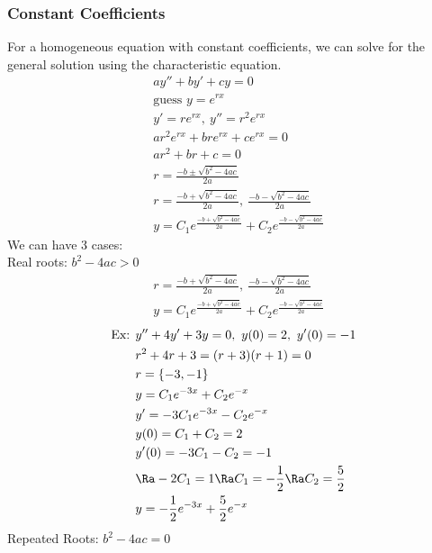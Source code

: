 \subsubsection{Constant Coefficients}
For a homogeneous equation with constant coefficients, we can solve for the general solution using the characteristic equation.
\begin{align*}
    &ay''+by'+cy=0\\
    &\text{guess }y=e^{rx}\\
    &y'=re^{rx},\ y''=r^2e^{rx}\\
    &ar^2e^{rx}+bre^{rx}+ce^{rx}=0\\
    &ar^2+br+c=0\\
    &r=\frac{-b\pm\sqrt{b^2-4ac}}{2a}\\
    &r=\frac{-b+\sqrt{b^2-4ac}}{2a},\ \frac{-b-\sqrt{b^2-4ac}}{2a}\\
    &y=C_1e^{\frac{-b+\sqrt{b^2-4ac}}{2a}}+C_2e^{\frac{-b-\sqrt{b^2-4ac}}{2a}}
\end{align*}
We can have 3 cases:\\
Real roots: $b^2-4ac>0$\\
\begin{align*}
    &r=\frac{-b+\sqrt{b^2-4ac}}{2a},\ \frac{-b-\sqrt{b^2-4ac}}{2a}\\
    &y=C_1e^{\frac{-b+\sqrt{b^2-4ac}}{2a}}+C_2e^{\frac{-b-\sqrt{b^2-4ac}}{2a}}
\end{align*}
\begin{align*}
    \text{Ex: }&y''+4y'+3y=0,\ y(0)=2,\ y'(0)=-1\\
    &r^2+4r+3=(r+3)(r+1)=0\\
    &r=\{-3,-1\}\\
    &y=C_1e^{-3x}+C_2e^{-x}\\
    &y'=-3C_1e^{-3x}-C_2e^{-x}\\
    &y(0)=C_1+C_2=2\\
    &y'(0)=-3C_1-C_2=-1\\
    &\Ra -2C_1=1\Ra C_1=-\frac{1}{2}\Ra C_2=\frac{5}{2}\\
    &y=-\frac{1}{2}e^{-3x}+\frac{5}{2}e^{-x}
\end{align*}
Repeated Roots: $b^2-4ac=0$
